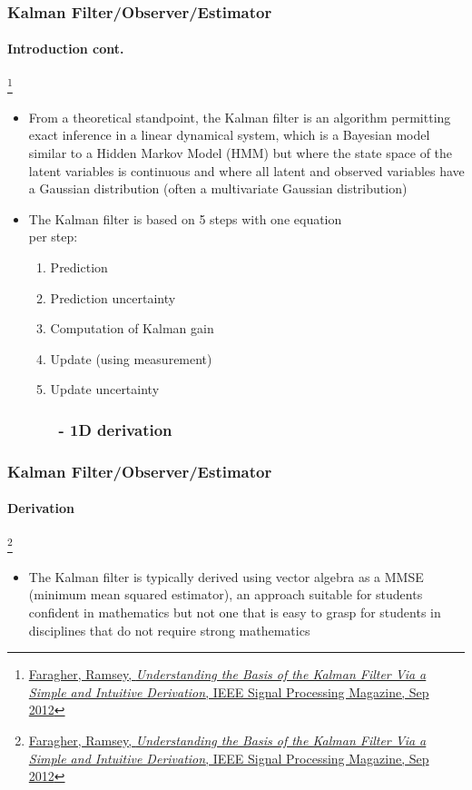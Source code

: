 \documentclass{beamer}
\begin{document}
\begin{frame}
\frametitle{Kalman Filter/Observer/Estimator}
\framesubtitle{Introduction \tiny cont.}

\footnote{\tiny\hspace{-0.23in} \href{http://www.cl.cam.ac.uk/~rmf25/papers/Understanding the Basis of the Kalman Filter.pdf}{Faragher, Ramsey, \emph{Understanding the Basis of the Kalman Filter Via a Simple and Intuitive Derivation}, IEEE Signal Processing Magazine, Sep 2012}}
\scriptsize
\begin{itemize}
\item From a theoretical standpoint, the Kalman filter is an algorithm permitting exact inference in a linear dynamical system, which is a Bayesian model similar to a Hidden Markov Model (HMM) but where the state space of the latent variables is continuous and where all latent and observed variables have a Gaussian distribution (often a multivariate Gaussian distribution)
\item The Kalman filter is based on 5 steps with one equation \\per step:
\begin{enumerate}\scriptsize 
\item {\color{red}Prediction}
\item {\color{red}Prediction uncertainty}
\item Computation of {\color{orange}Kalman gain}
\item {\color{darkgreen}Update} (using {\color{blue}measurement})
\item {\color{darkgreen}Update uncertainty}
\end{enumerate}\scriptsize 
\end{itemize}
\end{frame}

\subsubsection{\ \ \ \ \ \ - 1D derivation}
\begin{frame}
\frametitle{Kalman Filter/Observer/Estimator}
\framesubtitle{Derivation}

\footnote{\tiny\hspace{-0.23in} \href{http://www.cl.cam.ac.uk/~rmf25/papers/Understanding the Basis of the Kalman Filter.pdf}{Faragher, Ramsey, \emph{Understanding the Basis of the Kalman Filter Via a Simple and Intuitive Derivation}, IEEE Signal Processing Magazine, Sep 2012}}
\scriptsize
\begin{itemize}
\item The Kalman filter is typically derived using vector algebra as a MMSE (minimum mean squared estimator), an approach suitable for students confident in mathematics but not one that is easy to grasp for students in disciplines that do not require strong mathematics
\end{itemize}
\end{frame}
\end{document}
